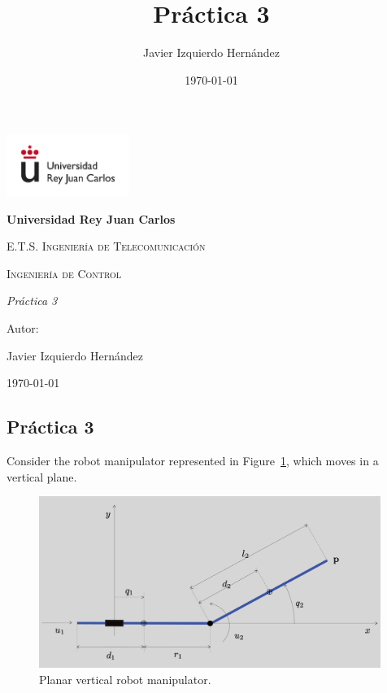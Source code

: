 \documentclass[a4paper]{article}
\title{Práctica 3}
\author{Javier Izquierdo Hernández}
\date{\today}
\begin{document}
	\begin{titlepage}
		\centering
		{\includegraphics[width=0.3\textwidth]{figures/logo}\par}
		\vspace{1cm}
		{\bfseries\LARGE Universidad Rey Juan Carlos \par}
		\vspace{1cm}
		{\scshape\Large E.T.S. Ingeniería de Telecomunicación \par}
		\vspace{3cm}
		{\scshape\Huge Ingeniería de Control \par}
		\vspace{3cm}
		{\itshape\Large Práctica 3 \par}
		\vfill
		{\Large Autor: \par}
		{\Large Javier Izquierdo Hernández \par}
		\vfill
		{\Large \today \par}
	\end{titlepage}

\begin{center}
\section*{\huge Pr\'actica 3}
\end{center}



Consider the robot manipulator represented in Figure~\ref{fig:PR_robot}, which moves in a vertical plane.




\begin{figure}[H]
\begin{center}
\includegraphics[width=0.99\textwidth]{figures/figure_1}
\caption{Planar vertical robot manipulator.}
\label{fig:PR_robot}
\end{center}
\end{figure} 
\end{document}

